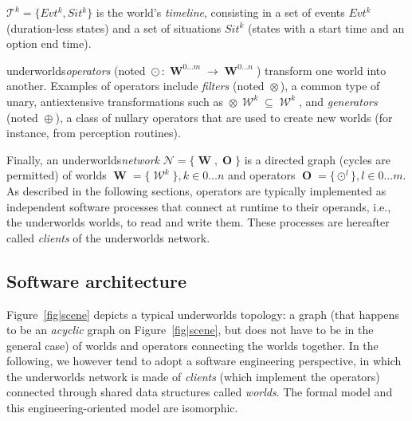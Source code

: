 \documentclass[letterpaper, 10pt, conference]{ieeeconf}
\newcommand{\ie}{i.e.,\xspace}
\newcommand{\uwds}{{\sc underworlds}\xspace}
\DeclareMathOperator{\op}{\odot}
\DeclareMathOperator{\filter}{\otimes}
\DeclareMathOperator{\generator}{\oplus}
\DeclareMathOperator{\W}{\mathcal{W}}
\DeclareMathOperator{\Ws}{\boldsymbol{W}}
\DeclareMathOperator{\Os}{\boldsymbol{O}}
\begin{document}
$\mathcal{T}^k=\{Evt^k, Sit^k\}$ is the world's \emph{timeline}, consisting in a
set of events $Evt^k$ (duration-less states) and a set of situations $Sit^k$
(states with a start time and an option end time).

\uwds \emph{operators} (noted $\op\colon \Ws^{0\ldots m} \rightarrow
\Ws^{0\ldots n}$) transform one world into another. Examples of operators
include \emph{filters} (noted $\filter$), a common type of unary, antiextensive
transformations such as $\filter\W^k \subseteq \W^k$, and \emph{generators}
(noted $\generator$), a class of nullary operators that are used to create new
worlds (for instance, from perception routines).

Finally, an \uwds \emph{network} $\mathcal{N} = \{\Ws, \Os\}$ is a directed graph (cycles are
permitted) of worlds $\Ws=\{\W^k\}, k\in0\ldots n$ and operators
$\Os=\{\op^l\}, l \in 0\ldots m$. As described in the following sections,
operators are typically implemented as independent software processes that connect at
runtime to their operands, \ie the \uwds worlds, to read and write them. These
processes are hereafter called \emph{clients} of the \uwds network.

%
%


\subsection{Software architecture}

Figure~\ref{fig|scene} depicts a typical \uwds topology: a graph (that happens
to be an \emph{acyclic} graph on Figure~\ref{fig|scene}, but does not have to
be in the general case) of worlds and operators connecting the worlds together.
In the following, we however tend to adopt a software engineering perspective,
in which the \uwds network is made of \emph{clients} (which implement the
operators) connected through shared data structures called \emph{worlds}.
The formal model and this engineering-oriented model are isomorphic.
\end{document}
